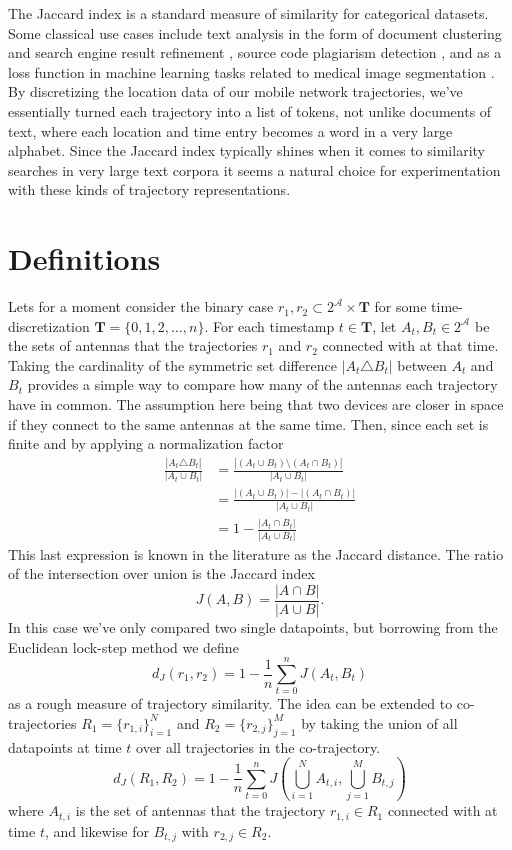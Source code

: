 \documentclass[../main.tex]{subfiles}
\begin{document}
The Jaccard index is a standard measure of similarity for categorical datasets. Some classical use cases include text analysis in the form of document clustering and search engine result refinement \cite{broder1997syntactic}, source code plagiarism detection \cite{moussiades2005pdetect}, and as a loss function in machine learning tasks related to medical image segmentation \cite{yuan2017automatic}. By discretizing the location data of our mobile network trajectories, we've essentially turned each trajectory into a list of tokens, not unlike documents of text, where each location and time entry becomes a word in a very large alphabet. Since the Jaccard index typically shines when it comes to similarity searches in very large text corpora it seems a natural choice for experimentation with these kinds of trajectory representations.

\section{Definitions}
Lets for a moment consider the binary case $r_1,r_2\subset 2^\mathcal{A} \times \mathbf{T}$ for some time-discretization $\mathbf{T} = \{0,1,2,\dots,n\}$. For each timestamp $t\in\mathbf{T}$, let $A_t, B_t \in 2^\mathcal{A}$ be the sets of antennas that the trajectories $r_1$ and $r_2$ connected with at that time. Taking the cardinality of the symmetric set difference $|A_t \triangle B_t|$ between $A_t$ and $B_t$ provides a simple way to compare how many of the antennas each trajectory have in common. The assumption here being that two devices are closer in space if they connect to the same antennas at the same time. Then, since each set is finite and by applying a normalization factor
\begingroup
\addtolength{\jot}{1em}
\begin{align*}
    \frac{|A_t \triangle B_t|}{|A_t \cup B_t|} &= \frac{|(A_t\cup B_t) \setminus (A_t\cap B_t)|}{|A_t \cup B_t|} \\
    &= \frac{|(A_t\cup B_t)| - |(A_t\cap B_t)|}{|A_t \cup B_t|} \\
    &= 1 - \frac{|A_t \cap B_t|}{|A_t \cup B_t|}
\end{align*}
\endgroup
This last expression is known in the literature as the Jaccard distance. The ratio of the intersection over union is the Jaccard index
$$
J(A,B) = \frac{|A \cap B|}{|A \cup B|}.
$$
In this case we've only compared two single datapoints, but borrowing from the Euclidean lock-step method we define
$$
d_J(r_1, r_2) = 1 - \frac{1}{n}\sum_{t=0}^nJ(A_t, B_t)
$$
as a rough measure of trajectory similarity. The idea can be extended to co-trajectories $R_1 = \{r_{1,i}\}_{i=1}^N$ and $R_2 = \{r_{2,j}\}_{j=1}^M$ by taking the union of all datapoints at time $t$ over all trajectories in the co-trajectory.
$$
d_J(R_1, R_2) = 1 - \frac{1}{n}\sum_{t=0}^nJ(\bigcup_{i=1}^NA_{t,i},\bigcup_{j=1}^MB_{t,j})
$$
where $A_{t,i}$ is the set of antennas that the trajectory $r_{1,i} \in R_1$ connected with at time $t$, and likewise for $B_{t,j}$ with $ r_{2,j} \in R_2$. 
\end{document}
